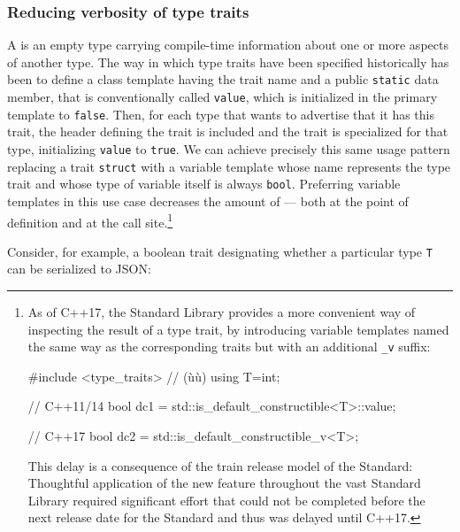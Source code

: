 \subsubsection[Reducing verbosity of type traits]{Reducing verbosity of type traits}\label{reducing-verbosity-of-type-traits}

A  is an empty type carrying compile-time information
about one or more aspects of another type. The way in which type traits
have been specified historically has been to define a class template
having the trait name and a public \lstinline!static! 
data member, that is conventionally called \lstinline!value!, which is
initialized in the primary template to \lstinline!false!. Then, for each
type that wants to advertise that it has this trait, the header defining
the trait is included and the trait is specialized for that type,
initializing \lstinline!value! to \lstinline!true!. We can achieve precisely
this same usage pattern replacing a trait \lstinline!struct! with a
variable template whose name represents the type trait and whose type of
variable itself is always \lstinline!bool!. Preferring variable templates
in this use case decreases the amount of  ---
both at the point of definition and at the call
site.{\cprotect\footnote{As of C++17, the Standard Library provides a
more convenient way of inspecting the result of a type trait, by
introducing variable templates named the same way as the corresponding
traits but with an additional \lstinline!_v! suffix:

\begin{emcppshiddenlisting}[emcppsbatch=e5,emcppsstandards={c++17}]
#include <type_traits>  // (ù{}ù)
using T=int;
\end{emcppshiddenlisting}
\begin{emcppslisting}[emcppsbatch=e5,emcppsstandards={c++14},style=footcode]
// C++11/14
bool dc1 = std::is_default_constructible<T>::value;

// C++17
bool dc2 = std::is_default_constructible_v<T>;
\end{emcppslisting}
This delay is a consequence of the train release model of the Standard: Thoughtful application of the new feature throughout the vast Standard Library required significant effort that could not be completed before the next release date for the Standard and thus was delayed until C++17.
      }}

Consider, for example, a boolean trait designating whether a particular
type \lstinline!T! can be serialized to JSON:

